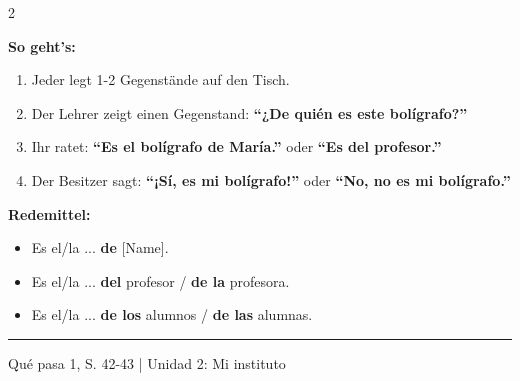 \documentclass[10pt, a4paper]{article}
\newcommand{\es}[1]{\textbf{#1}}
\begin{document}
\begin{multicols}{2}
\begin{merkbox}
{\small
\textbf{So geht's:}
\begin{enumerate}[leftmargin=1.5em, itemsep=1pt]
    \item Jeder legt 1-2 Gegenstände auf den Tisch.
    \item Der Lehrer zeigt einen Gegenstand: \es{``¿De quién es este bolígrafo?''}
    \item Ihr ratet: \es{``Es el bolígrafo de María.''} oder \es{``Es del profesor.''}
    \item Der Besitzer sagt: \es{``¡Sí, es mi bolígrafo!''} oder \es{``No, no es mi bolígrafo.''}
\end{enumerate}

\vspace{4pt}

\textbf{Redemittel:}
\begin{itemize}[leftmargin=1em, itemsep=1pt]
    \item Es el/la ... \es{de} [Name].
    \item Es el/la ... \es{del} profesor / \es{de la} profesora.
    \item Es el/la ... \es{de los} alumnos / \es{de las} alumnas.
\end{itemize}}

\end{merkbox}

\end{multicols}


\vfill

\noindent\rule{\textwidth}{0.5pt}

\vspace{2pt}

{\footnotesize\textcolor{mittelgrau}{Qué pasa 1, S. 42-43 | Unidad 2: Mi instituto}}
\end{document}
